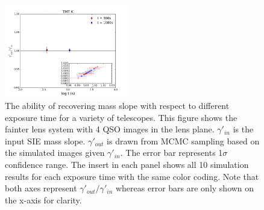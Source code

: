 \documentclass[a4paper,11pt]{article}
\begin{document}
\begin{figure}
\begin{center}
\includegraphics[width=0.48\textwidth]{figures/gamma_135949_4QSOimages_TMT.png}
\end{center}
\caption{The ability of recovering mass slope with respect to different exposure time for a variety of telescopes. This figure shows the fainter lens system with 4 QSO images in the lens plane. $\gamma'_{in}$ is the input SIE mass slope. $\gamma'_{out}$ is drawn from MCMC sampling based on the simulated images given $\gamma'_{in}$. The error bar represents 1$\sigma$ confidence range. The insert in each panel shows all 10 simulation results for each exposure time with the same color coding. Note that both axes represent $\gamma'_{out}/\gamma'_{in}$ whereas error bars are only shown on the x-axis for clarity.}
\label{fig:gamma_fainter_4QSOimages}
\end{figure}
\end{document}
